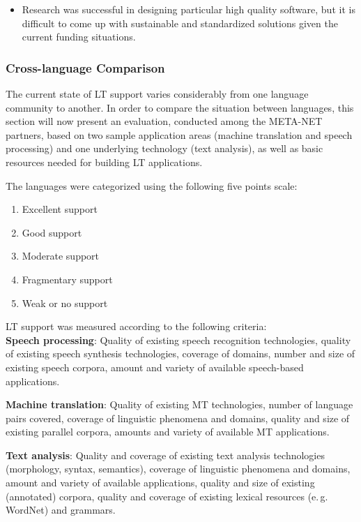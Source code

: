 \begin{multicols}{2}
\begin{itemize}
\item Research was successful in designing particular high quality software,
but it is difficult to come up with sustainable and standardized
solutions given the current funding situations.
\end{itemize}

\subsubsection{Cross-language Comparison}

The current state of LT support varies considerably from one language
community to another. In order to compare the situation between
languages, this section will now present an evaluation, conducted
among the META-NET partners, based on two sample application areas
(machine translation and speech processing) and one underlying
technology (text analysis), as well as basic resources needed for
building LT applications.

The languages were categorized using the following five points scale:
\begin{enumerate}
\item Excellent support
\item Good support
\item Moderate support
\item Fragmentary support
\item Weak or no support
\end{enumerate}

LT support was measured according to the following criteria:\\

{\bf Speech processing}: Quality of existing speech recognition
technologies, quality of existing speech synthesis technologies,
coverage of domains, number and size of existing speech corpora,
amount and variety of available speech-based applications.

{\bf Machine translation}: Quality of existing MT technologies, number
of language pairs covered, coverage of linguistic phenomena and
domains, quality and size of existing parallel corpora, amounts and
variety of available MT applications.

{\bf Text analysis}: Quality and coverage of existing text analysis
technologies (morphology, syntax, semantics), coverage of linguistic
phenomena and domains, amount and variety of available applications,
quality and size of existing (annotated) corpora, quality and coverage
of existing lexical resources (e.\,g. WordNet) and grammars.


\end{multicols}
